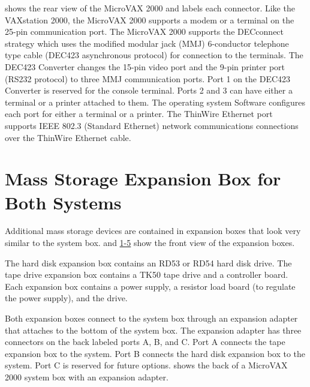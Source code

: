 
\newpage


 shows the rear view of the MicroVAX 2000 and labels each 
connector. Like the VAXstation 2000, the MicroVAX 2000 supports a modem
or a terminal on the 25-pin communication port. The MicroVAX 2000 
supports the DECconnect strategy which uses the modified modular jack (MMJ)
6-conductor telephone type cable (DEC423 asynchronous protocol) for 
connection to the terminals. The DEC423 Converter changes the 15-pin video
port and the 9-pin printer port (RS232 protocol) to three MMJ communication 
ports. Port 1 on the DEC423 Converter is reserved for the console
terminal. Ports 2 and 3 can have either a terminal or a printer attached to
them. The operating system Software configures each port for either a terminal 
or a printer. The ThinWire Ethernet port supports IEEE 802.3 (Standard
Ethernet) network communications connections over the ThinWire Ethernet
cable.


\section{Mass Storage Expansion Box for Both Systems}

Additional mass storage devices are contained in expansion boxes that look
very similar to the system box.  and \hyperref[figure:1-5]{1-5} show the front view of
the expansion boxes.

The hard disk expansion box contains an RD53 or RD54 hard disk drive.
The tape drive expansion box contains a TK50 tape drive and a controller
board. Each expansion box contains a power supply, a resistor load board
(to regulate the power supply), and the drive.


\newpage


\newpage

Both expansion boxes connect to the system box through an expansion
adapter that attaches to the bottom of the system box. The expansion
adapter has three connectors on the back labeled ports A, B, and C. Port
A connects the tape expansion box to the system. Port B connects the hard
disk expansion box to the system. Port C is reserved for future options. 
 shows the back of a MicroVAX 2000 system box with an expansion
adapter.

